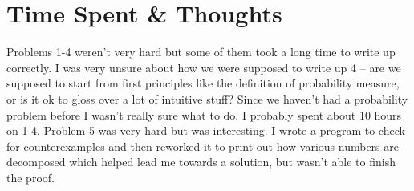 \documentclass[12pt]{article}
\begin{document}
\section{Time Spent \& Thoughts}
Problems 1-4 weren't very hard but some of them took a long time to write up correctly. I was very unsure about how we were supposed to write up 4 -- are we supposed to start from first principles like the definition of probability measure, or is it ok to gloss over a lot of intuitive stuff? Since we haven't had a probability problem before I wasn't really sure what to do. I probably spent about 10 hours on 1-4.
Problem 5 was very hard but was interesting. I wrote a program to check for counterexamples and then reworked it to print out how various numbers are decomposed which helped lead me towards a solution, but wasn't able to finish the proof.
\end{document}
